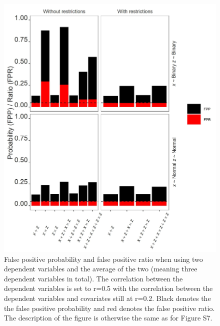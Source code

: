 \begin{figure}[hbt!]
\includegraphics{R/Analysis/Result/Figures/Figure3SIBon.jpeg}
\centering
\caption{False positive probability and false positive ratio when using two dependent variables and the average of the two (meaning three dependent variables in total). The correlation between the dependent variables is set to r=0.5 with the correlation between the dependent variables and covariates still at r=0.2. Black denotes the the false positive probability and red denotes the false positive ratio. The description of the figure is otherwise the same as for Figure S7.}
\label{fig:mainfigure}
\end{figure}


